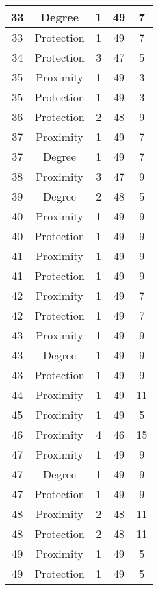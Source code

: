 \documentclass[results.tex]{subfiles}
\begin{document}
\begin{center}
\begin{tabular}{| c || c | c | c | c |}
    \hline
    33 & Degree & 1 & 49 & 7 \\ 
    \hline
    33 & Protection & 1 & 49 & 7 \\ 
    \hline
    34 & Protection & 3 & 47 & 5 \\ 
    \hline
    35 & Proximity & 1 & 49 & 3 \\ 
    \hline
    35 & Protection & 1 & 49 & 3 \\ 
    \hline
    36 & Protection & 2 & 48 & 9 \\ 
    \hline
    37 & Proximity & 1 & 49 & 7 \\ 
    \hline
    37 & Degree & 1 & 49 & 7 \\ 
    \hline
    38 & Proximity & 3 & 47 & 9 \\ 
    \hline
    39 & Degree & 2 & 48 & 5 \\ 
    \hline
    40 & Proximity & 1 & 49 & 9 \\ 
    \hline
    40 & Protection & 1 & 49 & 9 \\ 
    \hline
    41 & Proximity & 1 & 49 & 9 \\ 
    \hline
    41 & Protection & 1 & 49 & 9 \\ 
    \hline
    42 & Proximity & 1 & 49 & 7 \\ 
    \hline
    42 & Protection & 1 & 49 & 7 \\ 
    \hline
    43 & Proximity & 1 & 49 & 9 \\ 
    \hline
    43 & Degree & 1 & 49 & 9 \\ 
    \hline
    43 & Protection & 1 & 49 & 9 \\ 
    \hline
    44 & Proximity & 1 & 49 & 11 \\ 
    \hline
    45 & Proximity & 1 & 49 & 5 \\ 
    \hline
    46 & Proximity & 4 & 46 & 15 \\ 
    \hline
    47 & Proximity & 1 & 49 & 9 \\ 
    \hline
    47 & Degree & 1 & 49 & 9 \\ 
    \hline
    47 & Protection & 1 & 49 & 9 \\ 
    \hline
    48 & Proximity & 2 & 48 & 11 \\ 
    \hline
    48 & Protection & 2 & 48 & 11 \\ 
    \hline
    49 & Proximity & 1 & 49 & 5 \\ 
    \hline
    49 & Protection & 1 & 49 & 5 \\ 
    \hline   \end{tabular}
\end{center}
\end{document}
